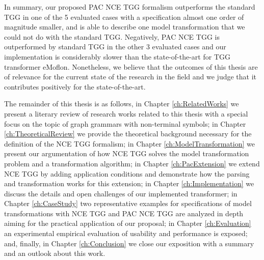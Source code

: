 
In summary, our proposed PAC NCE TGG formalism outperforms the standard TGG in one of the 5 evaluated cases with a specification almost one order of magnitude smaller, and is able to describe one model transformation that we could not do with the standard TGG. Negatively, PAC NCE TGG is outperformed by standard TGG in the other 3 evaluated cases and our implementation is considerably slower than the state-of-the-art for TGG transformer eMoflon. Nonetheless, we believe that the outcomes of this thesis are of relevance for the current state of the research in the field and we judge that it contributes positively for the state-of-the-art.

The remainder of this thesis is as follows, in Chapter \ref{ch:RelatedWorks} we present a literary review of research works related to this thesis with a special focus on the topic of graph grammars with non-terminal symbols; in Chapter \ref{ch:TheoreticalReview} we provide the theoretical background necessary for the definition of the NCE TGG formalism; in Chapter \ref{ch:ModelTransformation} we present our argumentation of how NCE TGG solves the model transformation problem and a transformation algorithm; in Chapter \ref{ch:PacExtension} we extend NCE TGG by adding application conditions and demonstrate how the parsing and transformation works for this extension; in Chapter \ref{ch:Implementation} we discuss the details and open challenges of our implemented transformer; in Chapter \ref{ch:CaseStudy} two representative examples for specifications of model transformations with NCE TGG and PAC NCE TGG are analyzed in depth aiming for the practical application of our proposal; in Chapter \ref{ch:Evaluation} an experimental empirical evaluation of usability and performance is exposed; and, finally, in Chapter \ref{ch:Conclusion} we close our exposition with a summary and an outlook about this work.
